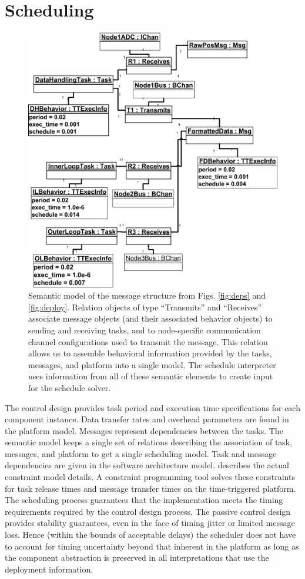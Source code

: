 \section{Scheduling}

\begin{figure}
\centering
\includegraphics[width=0.87\columnwidth]{figures/msg_struct.png}
    \caption{Semantic model of the message structure from Figs. \ref{fig:deps} and \ref{fig:deploy}. Relation 
objects of type "`Transmits"' and "`Receives"' associate message objects (and their associated behavior objects) 
to sending and receiving tasks, and to node-specific communication channel configurations used to transmit the 
message.  This relation allows us to assemble behavioral information provided by the tasks, messages, and 
platform into a single model.  The schedule interpreter uses information from all of these semantic elements to 
create input for the schedule solver. }
    \label{fig:msg_sched}
\end{figure}


The control design provides task period and execution time specifications for each component instance.  Data 
transfer rates and overhead parameters are found in the platform model.  Messages represent dependencies 
between the tasks.  The semantic model keeps a single set of relations describing the association of task, 
messages, and platform to get a single scheduling model.  Task and message dependencies are given in the 
software architecture model.  \cite{sched:analysis} describes the actual constraint model details.  A constraint 
programming tool solves these constraints for task release times and message transfer times on the time-triggered 
platform. The scheduling process guarantees that the implementation meets the timing requirements required by the 
control design process.  The passive control design provides stability guarantees, even in the face of timing 
jitter or limited message loss.  Hence (within the bounds of acceptable delays) the scheduler does not have to 
account for timing uncertainty beyond that inherent in the platform as long as the component abstraction is 
preserved in all interpretations that use the deployment information.

